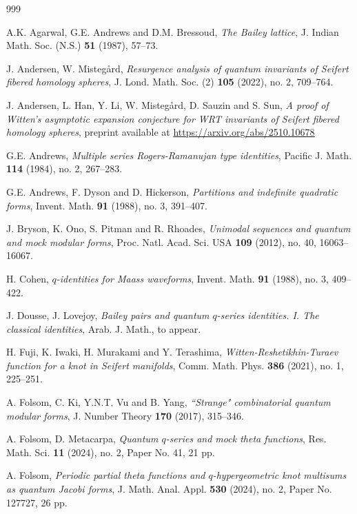 \documentclass[11pt,reqno]{amsart}
\theoremstyle{definition}
\numberwithin{equation}{section}
\renewcommand{\=}{\;=\;}
\begin{document}
\begin{thebibliography}{999}
	
A.K. Agarwal, G.E. Andrews and D.M. Bressoud, \emph{The Bailey lattice}, J. Indian Math. Soc. (N.S.) {\bf 51} (1987), 57–73.	

J. Andersen, W. Misteg{\aa}rd, \emph{Resurgence analysis of quantum invariants of Seifert fibered homology spheres}, J. Lond. Math. Soc. (2) \textbf{105} (2022), no. 2, 709--764.

J. Andersen, L. Han, Y. Li, W. Misteg{\aa}rd, D. Sauzin and S. Sun, \emph{A proof of Witten's asymptotic expansion conjecture for WRT invariants of Seifert fibered homology spheres}, preprint available at \url{https://arxiv.org/abs/2510.10678}

G.E. Andrews, \emph{Multiple series Rogers-Ramanujan type identities}, Pacific J. Math. {\bf 114} (1984), no. 2, 267--283.

G.E. Andrews, F. Dyson and D. Hickerson, \emph{Partitions and indefinite quadratic forms}, Invent. Math. \textbf{91} (1988), no. 3, 391--407.

J. Bryson, K. Ono, S. Pitman and R. Rhoades, \emph{Unimodal sequences and quantum and mock modular forms}, Proc. Natl. Acad. Sci. USA \textbf{109} (2012), no. 40, 16063--16067.

H. Cohen, \emph{$q$-identities for Maass waveforms}, Invent. Math. \textbf{91} (1988), no. 3, 409--422.

J. Dousse, J. Lovejoy, \emph{Bailey pairs and quantum $q$-series identities. I. The classical identities}, Arab. J. Math., to appear.

H. Fuji, K. Iwaki, H. Murakami and Y. Terashima, \emph{Witten-Reshetikhin-Turaev function for a knot in Seifert manifolds}, Comm. Math. Phys. \textbf{386} (2021), no. 1, 225--251.

A. Folsom, C. Ki, Y.N.T. Vu and B. Yang, \emph{``Strange" combinatorial quantum modular forms}, J. Number Theory \textbf{170} (2017), 315--346.

A. Folsom, D. Metacarpa, \emph{Quantum $q$-series and mock theta functions}, Res. Math. Sci. \textbf{11} (2024), no. 2, Paper No. 41, 21 pp.

A. Folsom, \emph{Periodic partial theta functions and $q$-hypergeometric knot multisums as quantum Jacobi forms}, J. Math. Anal. Appl. \textbf{530} (2024), no. 2, Paper No. 127727, 26 pp.


\end{thebibliography}
\end{document}
